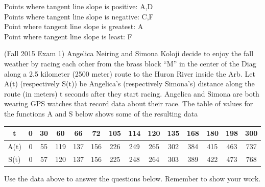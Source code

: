 \documentclass[11pt]{exam}
\begin{document}
\begin{questions}
\begin{figure}[htp]
		\end{figure}
\ifprintanswers \pagebreak \fi
\begin{solution}
  Points where tangent line slope is positive: A,D\\
  Points where tangent line slope is negative: C,F\\
  Point where tangent line slope is greatest: A\\
  Point where tangent line slope is least: F
\end{solution}
\question (Fall 2015 Exam 1) Angelica Neiring and Simona Koloji decide to enjoy the fall weather by racing
each other from the brass block “M” in the center of the Diag along a 2.5 kilometer (2500
meter) route to the Huron River inside the Arb. Let A(t) (respectively S(t)) be Angelica’s
(respectively Simona’s) distance along the route (in meters) t seconds after they start racing.
Angelica and Simona are both wearing GPS watches that record data about their race. The
table of values for the functions A and S below shows some of the resulting data
\begin{tabular}{|c|c|c|c|c|c|c|c|c|c|c|c|c|c|}
  \hline
t&0&30&60&66&72&105&114&120&135&168&180&198&300\\
  \hline
A(t)&0&55&119&137&156&226&249&265&302&384&415&463&737\\
  \hline
  S(t)&0&57&120&137&156&225&248&264&303&389&422&473&768\\
  \hline
\end{tabular}
Use the data above to answer the questions below. Remember to show your work.
\end{questions}
\end{document}
